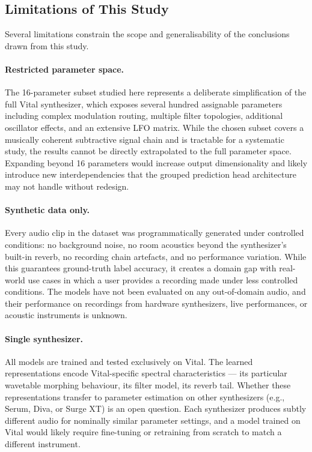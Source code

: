 \subsection{Limitations of This Study}

\noindent
Several limitations constrain the scope and generalisability of the conclusions drawn from this study.

\paragraph{Restricted parameter space.}
The 16-parameter subset studied here represents a deliberate simplification of the full Vital synthesizer, which exposes several hundred assignable parameters including complex modulation routing, multiple filter topologies, additional oscillator effects, and an extensive LFO matrix. While the chosen subset covers a musically coherent subtractive signal chain and is tractable for a systematic study, the results cannot be directly extrapolated to the full parameter space. Expanding beyond 16 parameters would increase output dimensionality and likely introduce new interdependencies that the grouped prediction head architecture may not handle without redesign.

\paragraph{Synthetic data only.}
Every audio clip in the dataset was programmatically generated under controlled conditions: no background noise, no room acoustics beyond the synthesizer's built-in reverb, no recording chain artefacts, and no performance variation. While this guarantees ground-truth label accuracy, it creates a domain gap with real-world use cases in which a user provides a recording made under less controlled conditions. The models have not been evaluated on any out-of-domain audio, and their performance on recordings from hardware synthesizers, live performances, or acoustic instruments is unknown.

\paragraph{Single synthesizer.}
All models are trained and tested exclusively on Vital. The learned representations encode Vital-specific spectral characteristics — its particular wavetable morphing behaviour, its filter model, its reverb tail. Whether these representations transfer to parameter estimation on other synthesizers (e.g., Serum, Diva, or Surge XT) is an open question. Each synthesizer produces subtly different audio for nominally similar parameter settings, and a model trained on Vital would likely require fine-tuning or retraining from scratch to match a different instrument.

